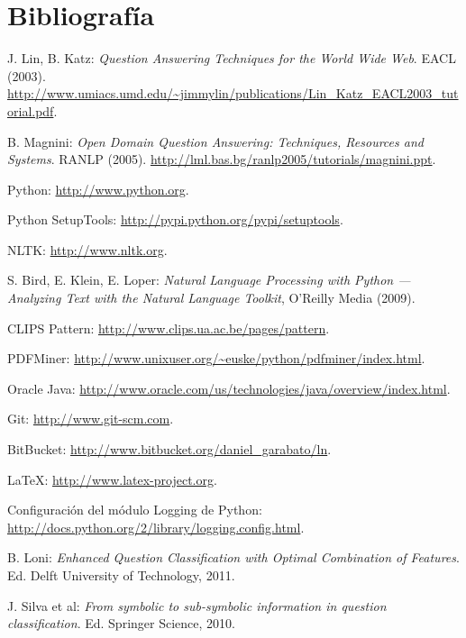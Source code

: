 \documentclass[12pt,a4paper,titlepage]{article}
\begin{document}
\section{Bibliografía}
\begin{thebibliography}{99}

J. Lin, B. Katz: \emph{Question Answering Techniques for the World Wide Web}. EACL (2003). \url{http://www.umiacs.umd.edu/~jimmylin/publications/Lin_Katz_EACL2003_tutorial.pdf}.

B. Magnini: \emph{Open Domain Question Answering: Techniques, Resources and Systems}. RANLP (2005). \url{http://lml.bas.bg/ranlp2005/tutorials/magnini.ppt}.

Python: \url{http://www.python.org}.

Python SetupTools: \url{http://pypi.python.org/pypi/setuptools}.

NLTK: \url{http://www.nltk.org}.

S. Bird, E. Klein, E. Loper: \emph{Natural Language Processing with Python --- Analyzing Text with the Natural Language Toolkit}, O'Reilly Media (2009).

CLIPS Pattern: \url{http://www.clips.ua.ac.be/pages/pattern}.

PDFMiner: \url{http://www.unixuser.org/~euske/python/pdfminer/index.html}.

Oracle Java: \url{http://www.oracle.com/us/technologies/java/overview/index.html}.

Git: \url{http://www.git-scm.com}.

BitBucket: \url{http://www.bitbucket.org/daniel_garabato/ln}.

\LaTeX: \url{http://www.latex-project.org}.

Configuración del módulo Logging de Python: \url{http://docs.python.org/2/library/logging.config.html}.

B. Loni: \emph{Enhanced Question Classification with Optimal Combination of Features}. Ed. Delft University of Technology, 2011.

J. Silva et al: \emph{From symbolic to sub-symbolic information in question classification}. Ed. Springer Science, 2010.

\end{thebibliography}
\end{document}
